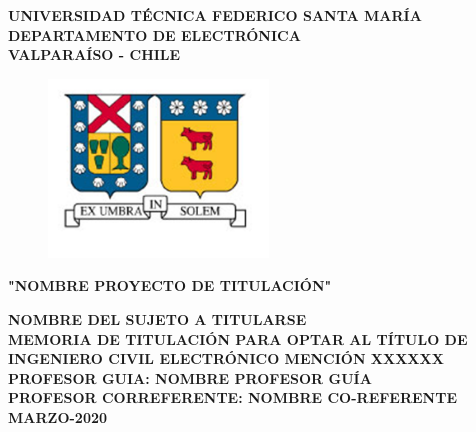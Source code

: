 \documentclass[main.tex]{subfiles}
\begin{document}
	\thispagestyle{empty}
	
	\begin{center}
		\linespread{1.15}
		\textbf{\large{UNIVERSIDAD TÉCNICA FEDERICO SANTA MARÍA\\}
			\normalsize{DEPARTAMENTO DE ELECTRÓNICA\\VALPARAÍSO - CHILE\\}}
		
		\vspace{0.5cm}
		\begin{figure}[H]
			\centering
			\includegraphics[width=5.85cm]{fig/usmLogo.png}
		\end{figure}
		\vspace{0.5cm}
		
		\linespread{1}\hangindent=0cm
		\textbf{\Large "NOMBRE PROYECTO DE TITULACIÓN"\\}
		\vspace{3cm}
		
		\hangindent=0cm\large \textbf{NOMBRE DEL SUJETO A TITULARSE}\\
		\vspace{0.5cm}
		\hangindent=0cm\normalsize \textbf{MEMORIA DE TITULACIÓN PARA OPTAR AL TÍTULO DE INGENIERO CIVIL ELECTRÓNICO MENCIÓN XXXXXX}\\
		\vspace{1cm}
		\hangindent=0cm\normalsize \textbf{PROFESOR GUIA: \hspace{2cm} NOMBRE PROFESOR GUÍA}\\
		\vspace{0.5cm}
		\hangindent=0cm\normalsize \textbf{PROFESOR CORREFERENTE: \hspace{2cm} NOMBRE CO-REFERENTE}\\
		\vspace{0.5cm}
		\hangindent=0cm\large \textbf{MARZO-2020}\\
		
	\end{center}
	
	\thispagestyle{empty}
	\newpage
\end{document}
